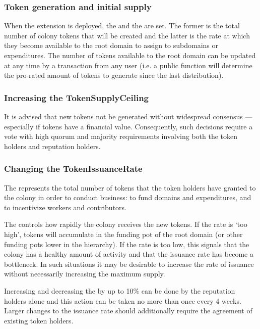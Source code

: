 \subsubsection*{Token generation and initial supply}

When the extension is deployed, the  and the  are set. The former is the total number of colony tokens that will be created and the latter is the rate at which they become available to the root domain to assign to subdomains or expenditures. The number of tokens available to the root domain can be updated at any time by a transaction from any user (i.e. a public function will determine the pro-rated amount of tokens to generate since the last distribution).

\subsubsection*{Increasing the TokenSupplyCeiling}

 It is advised that new tokens not be generated without widespread consensus --- especially if tokens have a financial value. Consequently, such decisions require a vote with high quorum and majority requirements involving both the token holders and reputation holders.

\subsubsection*{Changing the TokenIssuanceRate}

The  represents the total number of tokens that the token holders have granted to the colony in order to conduct business: to fund domains and expenditures, and to incentivize workers and contributors.

The  controls how rapidly the colony receives the new tokens. If the rate is `too high', tokens will accumulate in the funding pot of the root domain (or other funding pots lower in the hierarchy). If the rate is too low, this signals that the colony has a healthy amount of activity and that the issuance rate has become a bottleneck. In such situations it may be desirable to increase the rate of issuance without necessarily increasing the maximum supply.

Increasing and decreasing the  by up to 10\% can be done by the reputation holders alone and this action can be taken no more than once every 4 weeks. Larger changes to the issuance rate should additionally require the agreement of existing token holders.

